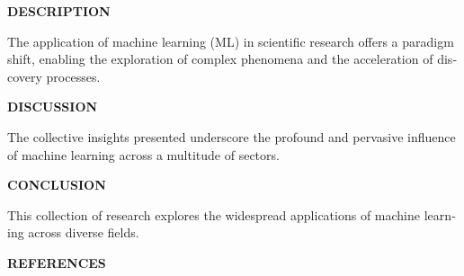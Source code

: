 \documentclass[11pt,a4paper]{article}
\newcommand{\subheadingfont}{\fontsize{11}{13}\bfseries\selectfont}
\begin{document}
\vspace{1em}

\begin{center}
    {\subheadingfont DESCRIPTION}
\end{center}

\vspace{0.2em}

\begin{otherlanguage}{english}
The application of machine learning (ML) in scientific research offers a paradigm shift, enabling the exploration of complex phenomena and the acceleration of discovery processes.
\end{otherlanguage}

\vspace{1em}

\begin{center}
    {\subheadingfont DISCUSSION}
\end{center}

\vspace{0.2em}

\begin{otherlanguage}{english}
The collective insights presented underscore the profound and pervasive influence of machine learning across a multitude of sectors.
\end{otherlanguage}

\vspace{1em}

\begin{center}
    {\subheadingfont CONCLUSION}
\end{center}

\vspace{0.2em}

\begin{otherlanguage}{english}
This collection of research explores the widespread applications of machine learning across diverse fields.
\end{otherlanguage}

\vspace{1em}

\begin{center}
    {\subheadingfont REFERENCES}
\end{center}
\end{document}
